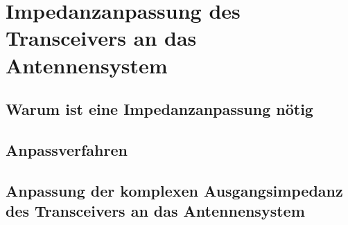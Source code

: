 \section{Impedanzanpassung des Transceivers an das Antennensystem}
\subsection{Warum ist eine Impedanzanpassung nötig}
\subsection{Anpassverfahren}
\subsection{Anpassung der komplexen Ausgangsimpedanz des Transceivers an das Antennensystem}